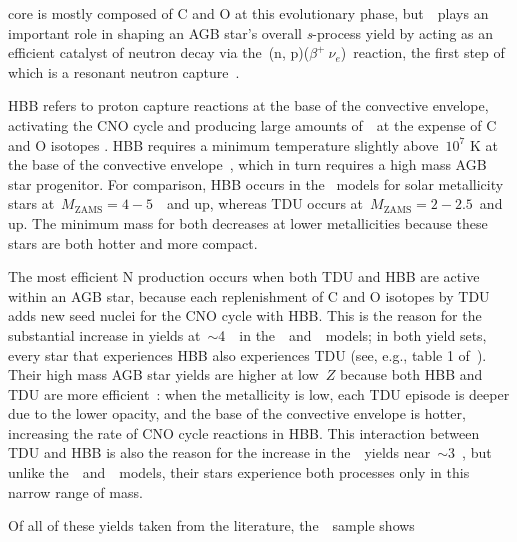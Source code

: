core is mostly composed of C and O at this evolutionary phase,
but~\Nfourteen~plays an important role in shaping an AGB star's overall
\textit{s}-process yield by acting as an efficient catalyst of neutron decay
via the~\Nfourteen(n, p)\Cfourteen($\beta^+~\nu_{e}$)\Nfourteen~reaction, the
first step of which is a resonant neutron capture~\citep{Cristallo2011}.
\par
HBB refers to proton capture reactions at the base of the convective envelope,
activating the CNO cycle and producing large amounts of~\Nfourteen~at the
expense of C and O isotopes
\citep*[e.g.,][]{Scalo1975, Bloecker1991}.
HBB requires a minimum temperature slightly above~$10^7$ K at the base of the
convective envelope~\citep[e.g.,][]{Sackmann1991}, which in turn requires a
high mass AGB star progenitor.
For comparison, HBB occurs in the~\citet{Karakas2010} models for solar
metallicity stars at~$M_\text{ZAMS} = 4 - 5$~\msun~and up, whereas TDU occurs
at~$M_\text{ZAMS} = 2 - 2.5$~\msun and up.
The minimum mass for both decreases at lower metallicities because these stars
are both hotter and more compact.
\par
The most efficient N production occurs when both TDU and HBB are active within
an AGB star, because each replenishment of C and O isotopes by TDU adds new
seed nuclei for the CNO cycle with HBB.
This is the reason for the substantial increase in yields at~$\sim$4~\msun~in
the~\karakasten~and~\karakas~models; in both yield sets, every star that
experiences HBB also experiences TDU (see, e.g., table 1
of~\citealp{Karakas2010}).
Their high mass AGB star yields are higher at low~$Z$ because both HBB and TDU
are more efficient~\citep[see discussion in][]{Ventura2013}: when the
metallicity is low, each TDU episode is deeper due to the lower opacity, and
the base of the convective envelope is hotter, increasing the rate of CNO cycle
reactions in HBB.
This interaction between TDU and HBB is also the reason for the increase in
the~\ventura~yields near~$\sim$3~\msun, but unlike
the~\karakasten~and~\karakas~models, their stars experience both processes only
in this narrow range of mass.
\par
Of all of these yields taken from the literature, the~\cristallo~sample shows
